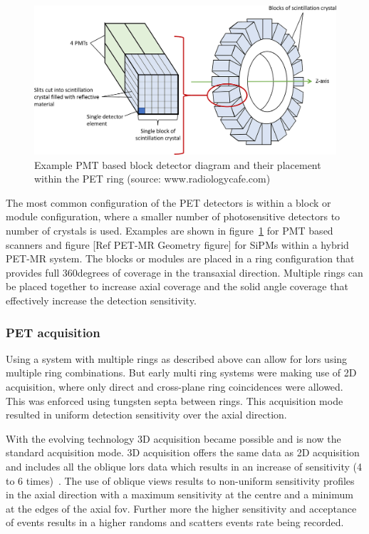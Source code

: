 \begin{figure} [h!]
\centering
\includegraphics[scale=0.25,angle=0]{2_Theory_Methods/figures/block_detector.png}
\caption{Example PMT based block detector diagram and their placement within the PET ring (source: www.radiologycafe.com) } 
\label{fig_2:BlockDetectorAndRing}
\end{figure} 


The most common configuration of the PET detectors is within a block or module configuration, where a smaller number of photosensitive detectors to number of crystals is used. Examples are shown in figure~\ref{fig_2:BlockDetectorAndRing} for PMT based scanners and figure [Ref PET-MR Geometry figure] for SiPMs within a hybrid PET-MR system. 
The blocks or modules are placed in a ring configuration that provides full 360degrees of coverage in the transaxial direction. Multiple rings can be placed together to increase axial coverage and the solid angle coverage that effectively increase the detection sensitivity. 

\subsubsection{PET acquisition}
Using a system with multiple rings as described above can allow for \glspl{lor} using multiple ring combinations. But early multi ring systems were making use of 2D acquisition, where only direct and cross-plane ring coincidences were allowed. This was enforced using tungsten septa between rings. This acquisition mode resulted in uniform detection sensitivity over the axial direction. 

With the evolving technology 3D acquisition became possible and is now the standard acquisition mode. 3D acquisition offers the same data as 2D acquisition and includes all the oblique \glspl{lor} data which results in an increase of sensitivity (4 to 6 times)~\cite{Fahey2002}. The use of oblique views results to non-uniform sensitivity profiles in the axial direction with a maximum sensitivity at the centre and a minimum at the edges of the axial \gls{fov}. Further more the higher sensitivity and acceptance of events results in a higher randoms and scatters events rate being recorded. 

